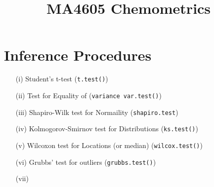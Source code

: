 \documentclass[12pt]{article}
\title{MA4605 Chemometrics}
\begin{document}
\maketitle
\tableofcontents

\section{Inference Procedures}

\begin{itemize}
\item[(i)] Student's t-test (\texttt{t.test()})
\item[(ii)] Test for Equality of (\texttt{variance var.test()})
\item[(iii)] Shapiro-Wilk test for Normaility (\texttt{shapiro.test})
\item[(iv)] Kolmogorov-Smirnov test for Distributions (\texttt{ks.test()})
\item[(v)] Wilcoxon test for Locations (or median) (\texttt{wilcox.test()})
\item[(vi)] Grubbs' test for outliers (\texttt{grubbs.test()})
\end{itemize}
\begin{itemize}
\item[(vii)]
\end{itemize}
\end{document}
